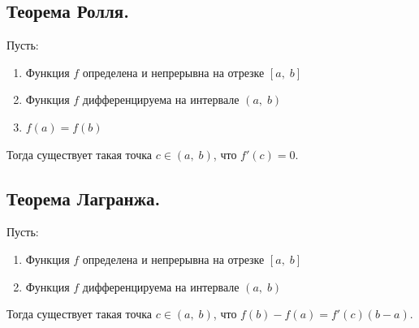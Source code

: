 

\label{sec_Definition12}
\begin{definition}
    \subsection*{Теорема Ролля.}
    \begin{note}[purple]
        Пусть:
        \begin{enumerate}
            \item Функция $f$ определена и непрерывна на отрезке $[a,\; b]$
            \item Функция $f$ дифференцируема на интервале $(a, \; b)$
            \item $f(a) = f(b)$
        \end{enumerate}
        Тогда существует такая точка $c \in (a, \; b)$, что $f'(c) = 0$. 
    \end{note}

    \subsection*{Теорема Лагранжа.}
    \begin{note}[purple]
        Пусть:
        \begin{enumerate}
            \item Функция $f$ определена и непрерывна на отрезке $[a,\; b]$
            \item Функция $f$ дифференцируема на интервале $(a, \; b)$
        \end{enumerate}
        Тогда существует такая точка $c \in (a, \; b)$, что $f(b) - f(a) = f'(c)(b - a)$.
    \end{note}
\end{definition}
